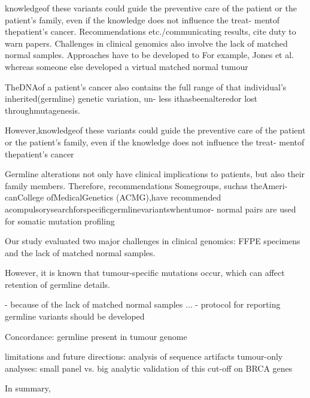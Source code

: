 knowledgeof these variants could guide the preventive care of the patient or the patient’s family, even if the knowledge does not influence the treat- mentof thepatient’s cancer. Recommendations etc./communicating results, cite duty to warn papers. Challenges in clinical genomics also involve the lack of matched normal samples. Approaches have to be developed to For example, Jones et al. \cite{ones2015a} whereas someone else developed a virtual matched normal tumour

TheDNAof a patient’s cancer also contains the full range
of that individual’s inherited(germline) genetic variation, un- less ithasbeenalteredor lost throughmutagenesis.

However,knowledgeof these variants could guide the preventive care of the patient or the patient’s family, even if the knowledge does not influence the treat- mentof thepatient’s cancer

Germline alterations not only have clinical implications to patients, but also their family members. Therefore, recommendations Somegroups, suchas theAmeri- canCollege ofMedicalGenetics (ACMG),have recommended acompulsorysearchforspecificgermlinevariantswhentumor- normal pairs are used for somatic mutation profiling

Our study evaluated two major challenges in clinical genomics: FFPE specimens and the lack of matched normal samples.




However, it is known that tumour-specific mutations occur, which can affect retention of germline details.


- because of the lack of matched normal samples ...
- protocol for reporting germline variants should be developed

Concordance: germline present in tumour genome

limitations and future directions:
analysis of sequence artifacts
tumour-only analyses: small panel vs. big
analytic validation of this cut-off on BRCA genes

In summary,


